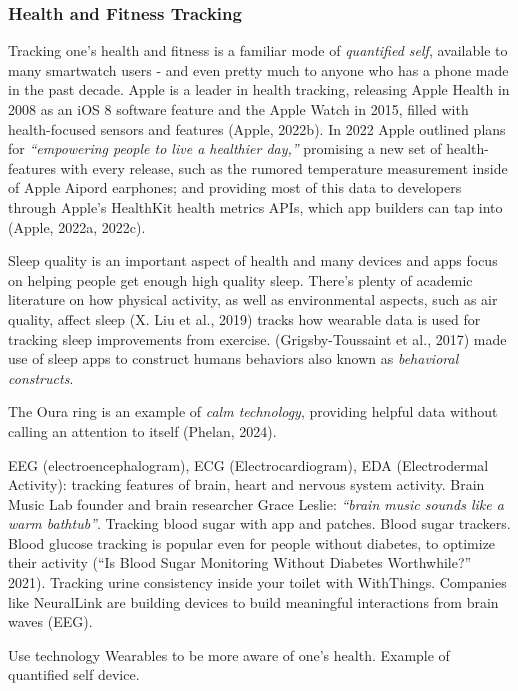 \documentclass[
  letterpaper,
  DIV=11,
  numbers=noendperiod]{scrartcl}
\begin{document}
\subsubsection{Health and Fitness
Tracking}\label{health-and-fitness-tracking}

Tracking one's health and fitness is a familiar mode of \emph{quantified
self}, available to many smartwatch users - and even pretty much to
anyone who has a phone made in the past decade. Apple is a leader in
health tracking, releasing Apple Health in 2008 as an iOS 8 software
feature and the Apple Watch in 2015, filled with health-focused sensors
and features (Apple, 2022b). In 2022 Apple outlined plans for
\emph{``empowering people to live a healthier day,''} promising a new
set of health-features with every release, such as the rumored
temperature measurement inside of Apple Aipord earphones; and providing
most of this data to developers through Apple's HealthKit health metrics
APIs, which app builders can tap into (Apple, 2022a, 2022c).

Sleep quality is an important aspect of health and many devices and apps
focus on helping people get enough high quality sleep. There's plenty of
academic literature on how physical activity, as well as environmental
aspects, such as air quality, affect sleep (X. Liu et al., 2019) tracks
how wearable data is used for tracking sleep improvements from exercise.
(Grigsby-Toussaint et al., 2017) made use of sleep apps to construct
humans behaviors also known as \emph{behavioral constructs}.

The Oura ring is an example of \emph{calm technology}, providing helpful
data without calling an attention to itself (Phelan, 2024).

EEG (electroencephalogram), ECG (Electrocardiogram), EDA (Electrodermal
Activity): tracking features of brain, heart and nervous system
activity. Brain Music Lab founder and brain researcher Grace Leslie:
\emph{``brain music sounds like a warm bathtub''}. Tracking blood sugar
with app and patches. Blood sugar trackers. Blood glucose tracking is
popular even for people without diabetes, to optimize their activity
({``Is Blood Sugar Monitoring Without Diabetes Worthwhile?''} 2021).
Tracking urine consistency inside your toilet with WithThings. Companies
like NeuralLink are building devices to build meaningful interactions
from brain waves (EEG).

Use technology Wearables to be more aware of one's health. Example of
quantified self device.
\end{document}
